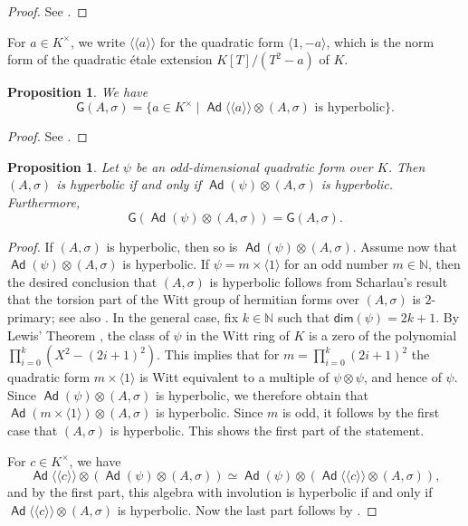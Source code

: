 \documentclass[twoside,11pt]{amsart}
\numberwithin{equation}{section}
\newtheorem{prop}[equation]{Proposition}
\theoremstyle{definition}
\renewcommand{\dim}{\mathsf{dim}}
\newcommand{\mg}[1]{{#1}^{\times}}
\newcommand{\s}{\sigma}
\newcommand{\nat}{\mathbb{N}}
\newcommand{\la}{\langle}
\newcommand{\ra}{\rangle}
\newcommand{\lla}{\la\!\la}
\newcommand{\rra}{\ra\!\ra}
\newcommand\Ad{\operatorname{\mathsf{Ad}}}
\newcommand{\G}{\mathsf{G}}
\begin{document}
\begin{proof}
    See \cite[Theorem 1]{Mer96}.
\end{proof}

For $a\in\mg{K}$, we write $\lla a\rra$ for the quadratic form $\la 1,-a\ra$, which is the norm form of the quadratic \'etale extension $K[T]/(T^2-a)$ of $K$.

\begin{prop}\label{sim-fac-hyp}
    We have 
    $$\G(A,\s)=\{a\in\mg{K}\mid \Ad\lla a\rra\otimes (A,\s)\text{ is hyperbolic}\}.$$
\end{prop}
\begin{proof}
    See \cite[Prop.~12.20]{KMRT98}.
\end{proof}

\begin{prop}\label{odddimnonzerodiv}
Let $\psi$ be an odd-dimensional quadratic form over $K$.
Then $(A,\s)$ is hyperbolic if and only if $\Ad(\psi)\otimes(A,\s)$ is hyperbolic. 
Furthermore, $$\G(\Ad(\psi)\otimes (A,\s))=\G(A,\s).$$
\end{prop}
\begin{proof}
If $(A,\s)$ is hyperbolic, then so is $\Ad(\psi)\otimes (A,\s)$.
Assume now that $\Ad(\psi)\otimes (A,\s)$ is hyperbolic.
If $\psi=m\times \la 1\ra$ for an odd number $m\in\nat$, then the desired conclusion that $(A,\s)$ is hyperbolic follows from Scharlau's result \cite[Theorem 5.1]{Scha70} that the torsion part of the Witt group of hermitian forms over $(A,\s)$ is $2$-primary; see also \cite[Theorem 6.5]{BU18}.
In the general case, fix $k\in\nat$ such that $\dim(\psi)=2k+1$.
By Lewis' Theorem \cite[Chap.~VIII, Theorem 8.13]{Lam05}, the class of $\psi$ in the Witt ring of $K$ is a zero of the polynomial $\prod_{i=0}^k(X^2-(2i+1)^2)$. This implies that for $m=\prod_{i=0}^k (2i+1)^2$ the quadratic form $m\times \la 1\ra$ is Witt equivalent to a multiple of $\psi\otimes\psi$, and hence of $\psi$.
Since $\Ad(\psi)\otimes (A,\s)$ is hyperbolic, we therefore obtain that $\Ad(m\times \la 1\ra)\otimes (A,\s)$ is hyperbolic.
Since $m$ is odd, it follows by the first case that $(A,\s)$ is hyperbolic.
    This shows the first part of the statement.

    For $c\in\mg{K}$, we have $$\Ad\lla c\rra\otimes(\Ad(\psi)\otimes (A,\s))\simeq \Ad(\psi)\otimes (\Ad\lla c\rra\otimes (A,\s)),$$ and by the first part, this algebra with involution is hyperbolic if and only if
    $\Ad\lla c\rra\otimes (A,\s)$ is hyperbolic. 
    Now the last part follows by .
\end{proof}
\end{document}

